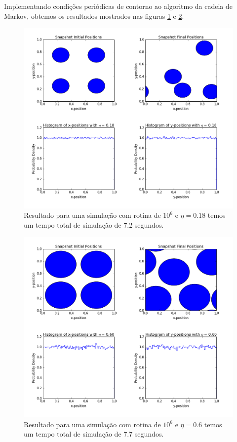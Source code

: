 \documentclass[%
reprint,
amsmath,amssymb,
aps,
12pt
]{revtex4-1}
\begin{document}
Implementando condições periódicas de contorno ao algoritmo da cadeia de Markov, obtemos os resultados mostrados nas figuras \ref*{cpc1} e \ref{cpc2}.

\begin{figure}[!h]
	\centering
	\includegraphics[scale=0.3]{cpc1.png}
	\caption{Resultado para uma simulação com rotina de $ 10^6 $ e $ \eta = 0.18 $ temos um tempo total de simulação de 7.2 segundos.
		\label{cpc1}}
\end{figure}
\clearpage
\begin{figure}[!h]
	\centering
	\includegraphics[scale=0.3]{cpc2.png}
	\caption{Resultado para uma simulação com rotina de $ 10^6 $ e $ \eta = 0.6 $ temos um tempo total de simulação de 7.7 segundos.
		\label{cpc2}}
\end{figure}
\end{document}
